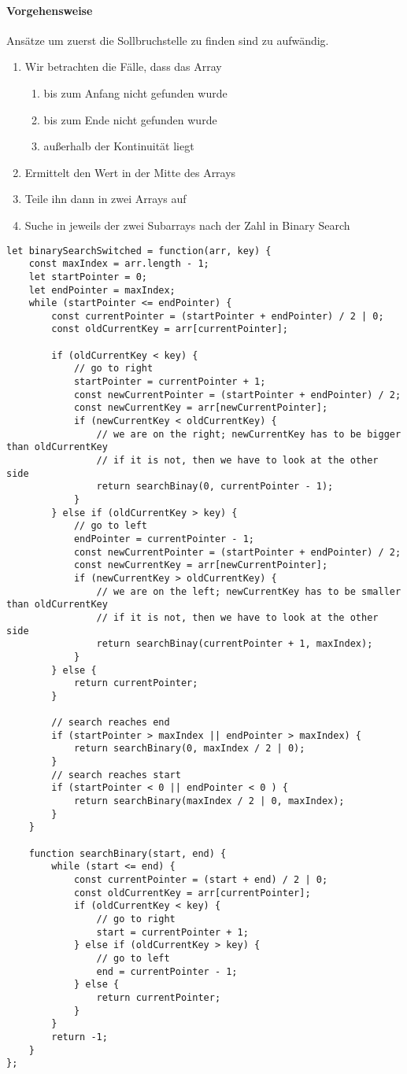 \documentclass{book}
\begin{document}
\paragraph{Vorgehensweise}
Ansätze um zuerst die Sollbruchstelle zu finden sind zu aufwändig.

\begin{enumerate} 
	\item Wir betrachten die Fälle, dass das Array
	\begin{enumerate}
		\item bis zum Anfang nicht gefunden wurde
		\item bis zum Ende nicht gefunden wurde
		\item außerhalb der Kontinuität liegt
	\end{enumerate}
	\item Ermittelt den Wert in der Mitte des Arrays
	\item Teile ihn dann in zwei Arrays auf
	\item Suche in jeweils der zwei Subarrays nach der Zahl in Binary Search
\end{enumerate}

\begin{lstlisting}[caption=My Javascript Example]
let binarySearchSwitched = function(arr, key) {
	const maxIndex = arr.length - 1;
	let startPointer = 0;
	let endPointer = maxIndex;
	while (startPointer <= endPointer) {
		const currentPointer = (startPointer + endPointer) / 2 | 0;
		const oldCurrentKey = arr[currentPointer];
		
		if (oldCurrentKey < key) {
			// go to right
			startPointer = currentPointer + 1;
			const newCurrentPointer = (startPointer + endPointer) / 2;
			const newCurrentKey = arr[newCurrentPointer];
			if (newCurrentKey < oldCurrentKey) {
				// we are on the right; newCurrentKey has to be bigger than oldCurrentKey
				// if it is not, then we have to look at the other side
				return searchBinay(0, currentPointer - 1);
			}
		} else if (oldCurrentKey > key) {
			// go to left
			endPointer = currentPointer - 1;
			const newCurrentPointer = (startPointer + endPointer) / 2;
			const newCurrentKey = arr[newCurrentPointer];
			if (newCurrentKey > oldCurrentKey) {
				// we are on the left; newCurrentKey has to be smaller than oldCurrentKey
				// if it is not, then we have to look at the other side
				return searchBinay(currentPointer + 1, maxIndex);
			}
		} else {
			return currentPointer;
		}
	
		// search reaches end
		if (startPointer > maxIndex || endPointer > maxIndex) {
			return searchBinary(0, maxIndex / 2 | 0);
		}
		// search reaches start
		if (startPointer < 0 || endPointer < 0 ) {
			return searchBinary(maxIndex / 2 | 0, maxIndex);
		}
	}

	function searchBinary(start, end) {
		while (start <= end) {
			const currentPointer = (start + end) / 2 | 0;
			const oldCurrentKey = arr[currentPointer];
			if (oldCurrentKey < key) {
				// go to right
				start = currentPointer + 1;
			} else if (oldCurrentKey > key) {
				// go to left
				end = currentPointer - 1;
			} else {
				return currentPointer;
			}
		}
		return -1;
	}
};
\end{lstlisting}
\end{document}

